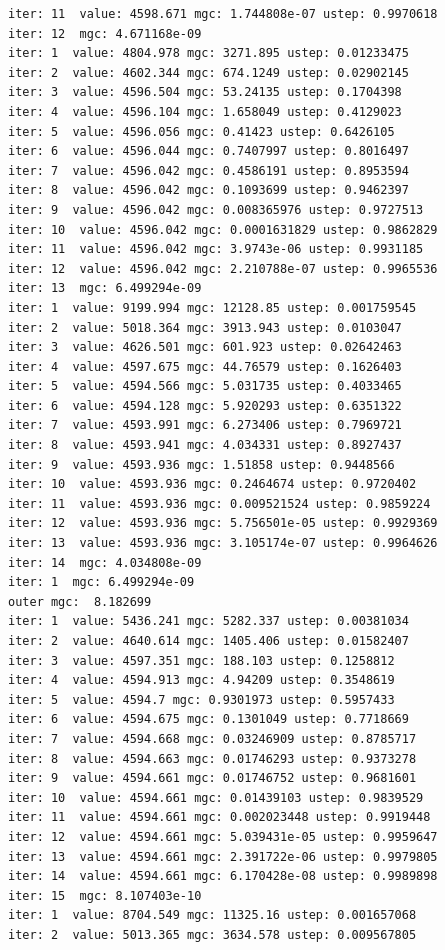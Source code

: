 \documentclass[
  letterpaper,
  DIV=11,
  numbers=noendperiod]{scrartcl}
\begin{document}
\begin{verbatim}
iter: 11  value: 4598.671 mgc: 1.744808e-07 ustep: 0.9970618 
iter: 12  mgc: 4.671168e-09 
iter: 1  value: 4804.978 mgc: 3271.895 ustep: 0.01233475 
iter: 2  value: 4602.344 mgc: 674.1249 ustep: 0.02902145 
iter: 3  value: 4596.504 mgc: 53.24135 ustep: 0.1704398 
iter: 4  value: 4596.104 mgc: 1.658049 ustep: 0.4129023 
iter: 5  value: 4596.056 mgc: 0.41423 ustep: 0.6426105 
iter: 6  value: 4596.044 mgc: 0.7407997 ustep: 0.8016497 
iter: 7  value: 4596.042 mgc: 0.4586191 ustep: 0.8953594 
iter: 8  value: 4596.042 mgc: 0.1093699 ustep: 0.9462397 
iter: 9  value: 4596.042 mgc: 0.008365976 ustep: 0.9727513 
iter: 10  value: 4596.042 mgc: 0.0001631829 ustep: 0.9862829 
iter: 11  value: 4596.042 mgc: 3.9743e-06 ustep: 0.9931185 
iter: 12  value: 4596.042 mgc: 2.210788e-07 ustep: 0.9965536 
iter: 13  mgc: 6.499294e-09 
iter: 1  value: 9199.994 mgc: 12128.85 ustep: 0.001759545 
iter: 2  value: 5018.364 mgc: 3913.943 ustep: 0.0103047 
iter: 3  value: 4626.501 mgc: 601.923 ustep: 0.02642463 
iter: 4  value: 4597.675 mgc: 44.76579 ustep: 0.1626403 
iter: 5  value: 4594.566 mgc: 5.031735 ustep: 0.4033465 
iter: 6  value: 4594.128 mgc: 5.920293 ustep: 0.6351322 
iter: 7  value: 4593.991 mgc: 6.273406 ustep: 0.7969721 
iter: 8  value: 4593.941 mgc: 4.034331 ustep: 0.8927437 
iter: 9  value: 4593.936 mgc: 1.51858 ustep: 0.9448566 
iter: 10  value: 4593.936 mgc: 0.2464674 ustep: 0.9720402 
iter: 11  value: 4593.936 mgc: 0.009521524 ustep: 0.9859224 
iter: 12  value: 4593.936 mgc: 5.756501e-05 ustep: 0.9929369 
iter: 13  value: 4593.936 mgc: 3.105174e-07 ustep: 0.9964626 
iter: 14  mgc: 4.034808e-09 
iter: 1  mgc: 6.499294e-09 
outer mgc:  8.182699 
iter: 1  value: 5436.241 mgc: 5282.337 ustep: 0.00381034 
iter: 2  value: 4640.614 mgc: 1405.406 ustep: 0.01582407 
iter: 3  value: 4597.351 mgc: 188.103 ustep: 0.1258812 
iter: 4  value: 4594.913 mgc: 4.94209 ustep: 0.3548619 
iter: 5  value: 4594.7 mgc: 0.9301973 ustep: 0.5957433 
iter: 6  value: 4594.675 mgc: 0.1301049 ustep: 0.7718669 
iter: 7  value: 4594.668 mgc: 0.03246909 ustep: 0.8785717 
iter: 8  value: 4594.663 mgc: 0.01746293 ustep: 0.9373278 
iter: 9  value: 4594.661 mgc: 0.01746752 ustep: 0.9681601 
iter: 10  value: 4594.661 mgc: 0.01439103 ustep: 0.9839529 
iter: 11  value: 4594.661 mgc: 0.002023448 ustep: 0.9919448 
iter: 12  value: 4594.661 mgc: 5.039431e-05 ustep: 0.9959647 
iter: 13  value: 4594.661 mgc: 2.391722e-06 ustep: 0.9979805 
iter: 14  value: 4594.661 mgc: 6.170428e-08 ustep: 0.9989898 
iter: 15  mgc: 8.107403e-10 
iter: 1  value: 8704.549 mgc: 11325.16 ustep: 0.001657068 
iter: 2  value: 5013.365 mgc: 3634.578 ustep: 0.009567805 

\end{verbatim}
\end{document}
